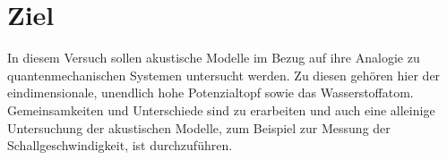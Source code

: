 \section{Ziel}
\label{sec:Ziel}
In diesem Versuch sollen akustische Modelle im Bezug auf ihre Analogie zu quantenmechanischen Systemen untersucht werden. Zu diesen gehören hier der eindimensionale, unendlich hohe Potenzialtopf sowie das Wasserstoffatom. Gemeinsamkeiten und Unterschiede sind zu erarbeiten und auch eine alleinige Untersuchung der akustischen Modelle, zum Beispiel zur Messung der Schallgeschwindigkeit, ist durchzuführen.
